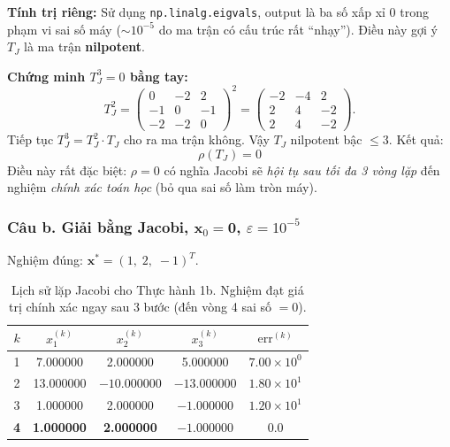 \documentclass[12pt,a4paper]{article}
\begin{document}
\textbf{Tính trị riêng:} Sử dụng \texttt{np.linalg.eigvals}, output là ba số xấp xỉ 0 trong phạm vi sai số máy ($\sim 10^{-5}$ do ma trận có cấu trúc rất ``nhạy''). Điều này gợi ý $T_J$ là ma trận \textbf{nilpotent}.

\textbf{Chứng minh $T_J^3 = 0$ bằng tay:}
\[
    T_J^2 = \begin{pmatrix} 0 & -2 & 2 \\ -1 & 0 & -1 \\ -2 & -2 & 0 \end{pmatrix}^2
          = \begin{pmatrix} -2 & -4 & 2 \\ 2 & 4 & -2 \\ 2 & 4 & -2 \end{pmatrix}.
\]
Tiếp tục $T_J^3 = T_J^2\cdot T_J$ cho ra ma trận không. Vậy $T_J$ nilpotent bậc $\le 3$. Kết quả:
\begin{equation}
    \boxed{\;\rho(T_J) = 0\;}
\end{equation}
Điều này rất đặc biệt: $\rho = 0$ có nghĩa Jacobi sẽ \emph{hội tụ sau tối đa 3 vòng lặp} đến nghiệm \emph{chính xác toán học} (bỏ qua sai số làm tròn máy).

\subsubsection{Câu b. Giải bằng Jacobi, $\mathbf{x}_0 = \mathbf{0}$, $\varepsilon = 10^{-5}$}

Nghiệm đúng: $\mathbf{x}^\ast = (1,\; 2,\; -1)^T$.

\begin{table}[H]
    \centering
    \begin{tabular}{ccccc}
        \toprule
        $k$ & $x_1^{(k)}$ & $x_2^{(k)}$ & $x_3^{(k)}$ & $\mathrm{err}^{(k)}$ \\
        \midrule
        1 &  7.000000 &   2.000000 &   5.000000 & $7.00\times 10^0$ \\
        2 & 13.000000 & $-10.000000$ & $-13.000000$ & $1.80\times 10^1$ \\
        3 &  1.000000 &   2.000000 &  $-1.000000$ & $1.20\times 10^1$ \\
        \textbf{4} &  \textbf{1.000000} & \textbf{2.000000} & $\mathbf{-1.000000}$ & $\mathbf{0.0}$ \\
        \bottomrule
    \end{tabular}
    \caption{Lịch sử lặp Jacobi cho Thực hành 1b. Nghiệm đạt giá trị chính xác ngay sau 3 bước (đến vòng 4 sai số $= 0$).}
    \label{tab:1b_jacobi}
\end{table}
\end{document}
